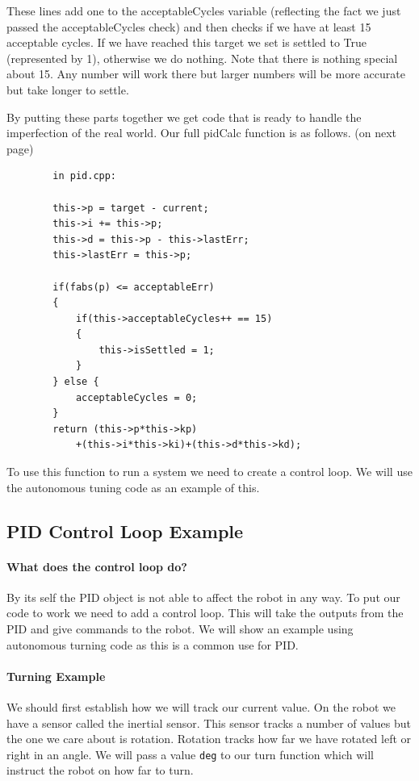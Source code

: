\documentclass[12pt]{report}
\begin{document}
    These lines add one to the acceptableCycles variable (reflecting the fact we just passed the acceptableCycles check) and then checks if we have at least 15 acceptable cycles.
    If we have reached this target we set is settled to True (represented by 1), otherwise we do nothing. 
    Note that there is nothing special about 15.
    Any number will work there but larger numbers will be more accurate but take longer to settle.

    By putting these parts together we get code that is ready to handle the imperfection of the real world. Our full pidCalc function is as follows. (on next page)

    \begin{verbatim}
        in pid.cpp:

        this->p = target - current;
        this->i += this->p;
        this->d = this->p - this->lastErr;
        this->lastErr = this->p;

        if(fabs(p) <= acceptableErr)
        {
            if(this->acceptableCycles++ == 15)
            {
                this->isSettled = 1;
            }
        } else {
            acceptableCycles = 0;
        }
        return (this->p*this->kp)
            +(this->i*this->ki)+(this->d*this->kd);
    \end{verbatim}

    To use this function to run a system we need to create a control loop. We will use the autonomous tuning code as an example of this.

\subsection{PID Control Loop Example}
\paragraph{What does the control loop do?}
    By its self the PID object is not able to affect the robot in any way.
    To put our code to work we need to add a control loop.
    This will take the outputs from the PID and give commands to the robot.
    We will show an example using autonomous turning code as this is a common use for PID.

\paragraph{Turning Example}

    We should first establish how we will track our current value. On the robot we have a sensor called the inertial sensor.
    This sensor tracks a number of values but the one we care about is rotation. Rotation tracks how far we have rotated left or right in an angle.
    We will pass a value \verb|deg| to our turn function which will instruct the robot on how far to turn.
\end{document}
